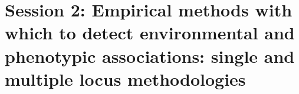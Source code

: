 \section[Session 2]{Session 2: Empirical methods with which to detect
environmental and phenotypic associations: single and multiple locus methodologies}

\begin{frame}

\end{frame}